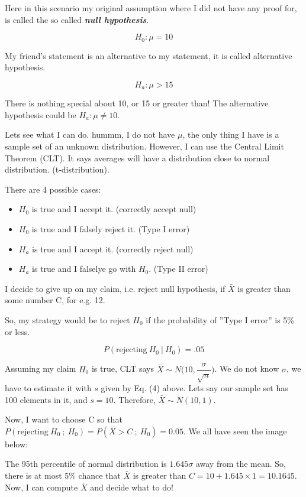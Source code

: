 \documentclass[11pt]{article}
\providecommand{\tightlist}{%
      \setlength{\itemsep}{0pt}\setlength{\parskip}{0pt}}
\begin{document}
Here in this scenario my original assumption where I did not have any
proof for, is called the so called \textbf{\emph{null hypothesis}}.

\[H_0: \mu=10 \tag{7 - null hypothesis}\]

My friend's statement is an alternative to my statement, it is called
alternative hypothesis.

\[H_a: \mu>15 \tag{8 - alternative hypothesis}\]

There is nothing special about 10, or 15 or greater than! The
alternative hypothesis could be $H_a:\mu \ne 10$.

    Lets see what I can do. hummm, I do not have $\mu$, the only thing I
have is a sample set of an unknown distribution. However, I can use the
Central Limit Theorem (CLT). It says averages will have a distribution
close to normal distribution. (t-distribution).

There are 4 possible cases:

\begin{itemize}
\tightlist
\item
  $H_0$ is true and I accept it. (correctly accept null)
\item
  $H_0$ is true and I falsely reject it. (Type I error)
\item
  $H_a$ is true and I accept it. (correctly reject null)
\item
  $H_a$ is true and I falselye go with $H_0$. (Type II error)
\end{itemize}

I decide to give up on my claim, i.e. reject null hypothesis, if
$\bar{X}$ is greater than some number C, for e.g. 12.

So, my strategy would be to reject $H_0$ if the probability of ''Type
I error'' is 5\% or less.

\[P(\text{rejecting}\: H_0\: |\: H_0) = .05\]

Assuming my claim $H_0$ is true, CLT says
$\bar{X} \sim N\big(10, \dfrac{\sigma}{\sqrt{n}}\big)$. We do not know
$\sigma$, we have to estimate it with $s$ given by Eq. (4) above.
Lets say our sample set has 100 elements in it, and $s=10$. Therefore,
$\bar{X} \sim N(10, 1)$.

Now, I want to choose C so that
$P(\text{rejecting}\: H_0\: ; \: H_0) = P(\bar{X}>C \: ; \: H_0) = 0.05$.
We all have seen the image below:

The 95th percentile of normal distribution is $1.645 \sigma$ away from
the mean. So, there is at most 5\% chance that $\bar{X}$ is greater
than $C=10+1.645 \times 1 = 10.1645$. Now, I can compute $\bar{X}$
and decide what to do!
\end{document}
